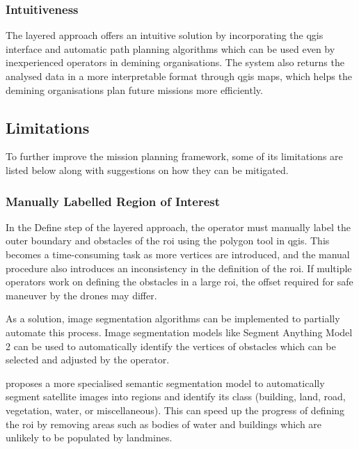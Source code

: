 \subsubsection{Intuitiveness}

The layered approach offers an intuitive solution by incorporating the \gls{qgis} interface and automatic path planning algorithms which can be used even by inexperienced operators in demining organisations. The system also returns the analysed data in a more interpretable format through \gls{qgis} maps, which helps the demining organisations plan future missions more efficiently.

\subsection{Limitations}
\label{sec:msp_limitations}

To further improve the mission planning framework, some of its limitations are listed below along with suggestions on how they can be mitigated. 

\subsubsection{Manually Labelled Region of Interest}

In the Define step of the layered approach, the operator must manually label the outer boundary and obstacles of the \gls{roi} using the polygon tool in \gls{qgis}. This becomes a time-consuming task as more vertices are introduced, and the manual procedure also introduces an inconsistency in the definition of the \gls{roi}. If multiple operators work on defining the obstacles in a large \gls{roi}, the offset required for safe maneuver by the drones may differ. 

As a solution, image segmentation algorithms can be implemented to partially automate this process. Image segmentation models like Segment Anything Model 2 \cite{ravi2024sam2} can be used to automatically identify the vertices of obstacles which can be selected and adjusted by the operator. 

\cite{patil2022segment} proposes a more specialised semantic segmentation model to automatically segment satellite images into regions and identify its class (building, land, road, vegetation, water, or miscellaneous). This can speed up the progress of defining the \gls{roi} by removing areas such as bodies of water and buildings which are unlikely to be populated by landmines. 

